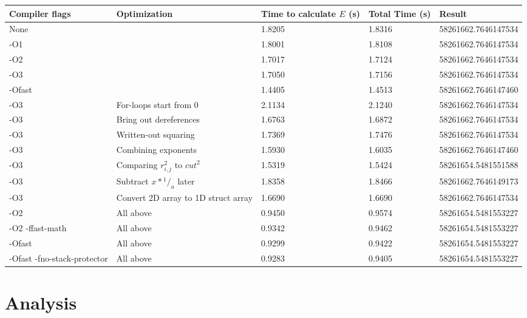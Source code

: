 \documentclass[12pt]{article}
\begin{document}
	\singlespacing
	\begin{center}
	\begin{tabular}{| p{3cm} | p{4cm} | p{1.5cm} | p{1.5cm} | l |}
	\hline
	Compiler flags & Optimization\footnotemark[1] & Time to calculate $E$ (s) & Total Time (s) & Result \\ \hline
	None & & 1.8205 & 1.8316 & 58261662.7646147534 \\ \hline
	-O1 & & 1.8001 & 1.8108 & 58261662.7646147534 \\ \hline
	-O2 & & 1.7017 & 1.7124 & 58261662.7646147534 \\ \hline
	-O3 & & 1.7050 & 1.7156 & 58261662.7646147534 \\ \hline
	-Ofast & & 1.4405 & 1.4513 & 58261662.7646147460 \\ \hline
	-O3 & For-loops start from 0 & 2.1134 & 2.1240 & 58261662.7646147534 \\ \hline
	-O3 & Bring out dereferences & 1.6763 & 1.6872 & 58261662.7646147534 \\ \hline
	-O3 & Written-out squaring & 1.7369 & 1.7476 & 58261662.7646147534 \\ \hline
	-O3 & Combining exponents & 1.5930 & 1.6035 & 58261662.7646147460 \\ \hline
	-O3 & Comparing $r_{i,j}^2$ to $cut^2$ & 1.5319 & 1.5424 & 58261654.5481551588 \\ \hline
	-O3 & Subtract $x*{^1/_a}$ later & 1.8358 & 1.8466 & 58261662.7646149173 \\ \hline
	-O3 & Convert 2D array to 1D struct array & 1.6690 & 1.6690 & 58261662.7646147534 \\ \hline
	-O2 & All above & 0.9450 & 0.9574 & 58261654.5481553227 \\ \hline
	-O2 -ffast-math & All above & 0.9342 & 0.9462 & 58261654.5481553227 \\ \hline
	-Ofast & All above & 0.9299 & 0.9422 & 58261654.5481553227 \\ \hline
	-Ofast -fno-stack-protector & All above & 0.9283 & 0.9405 & 58261654.5481553227 \\ \hline
	\end{tabular}
	\end{center}
	\doublespacing

	\section{Analysis}
\end{document}
